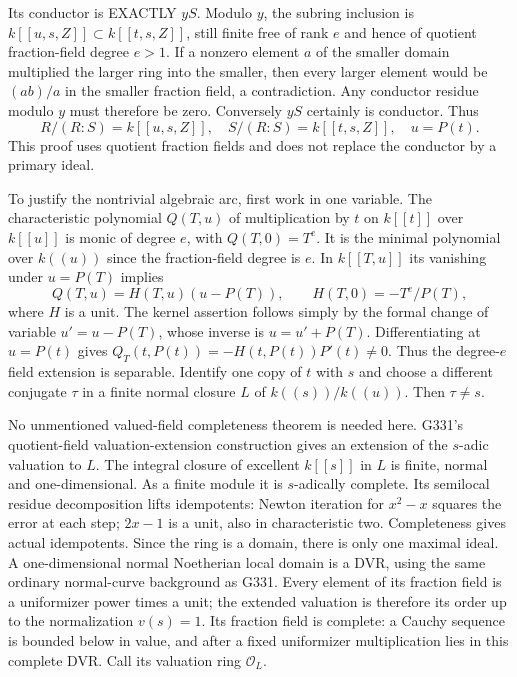 Its conductor is EXACTLY $yS$. Modulo $y$, the subring inclusion is
$k[[u,s,Z]]\subset k[[t,s,Z]]$, still finite free of rank $e$ and hence
of quotient fraction-field degree $e>1$. If a nonzero element $a$ of the
smaller domain multiplied the larger ring into the smaller, then every
larger element would be $(ab)/a$ in the smaller fraction field, a
contradiction. Any conductor residue modulo $y$ must therefore be zero.
Conversely $yS$ certainly is conductor. Thus
\[
 R/(R:S)=k[[u,s,Z]],\quad S/(R:S)=k[[t,s,Z]],\quad u=P(t).
\]
This proof uses quotient fraction fields and does not replace the
conductor by a primary ideal.

To justify the nontrivial algebraic arc, first work in one variable.
The characteristic polynomial $Q(T,u)$ of multiplication by $t$ on
$k[[t]]$ over $k[[u]]$ is monic of degree $e$, with $Q(T,0)=T^e$.
It is the minimal polynomial over $k((u))$ since the fraction-field
degree is $e$. In $k[[T,u]]$ its vanishing under $u=P(T)$ implies
\[
 Q(T,u)=H(T,u)(u-P(T)),\qquad H(T,0)=-T^e/P(T),
\]
where $H$ is a unit. The kernel assertion follows simply by the formal
change of variable $u'=u-P(T)$, whose inverse is $u=u'+P(T)$.
Differentiating at $u=P(t)$ gives
$Q_T(t,P(t))=-H(t,P(t))P'(t)\ne0$. Thus the degree-$e$ field extension
is separable. Identify one copy of $t$ with $s$ and choose a different
conjugate $\tau$ in a finite normal closure $L$ of $k((s))/k((u))$.
Then $\tau\ne s$.

No unmentioned valued-field completeness theorem is needed here.
G331's quotient-field valuation-extension construction gives an extension
of the $s$-adic valuation to $L$. The integral closure of excellent
$k[[s]]$ in $L$ is finite, normal and one-dimensional. As a finite module
it is $s$-adically complete. Its semilocal residue decomposition lifts
idempotents: Newton iteration for $x^2-x$ squares the error at each step;
$2x-1$ is a unit, also in characteristic two. Completeness gives actual
idempotents. Since the ring is a domain, there is only one maximal ideal.
A one-dimensional normal Noetherian local domain is a DVR, using the same
ordinary normal-curve background as G331. Every element of its fraction
field is a uniformizer power times a unit; the extended valuation is
therefore its order up to the normalization $v(s)=1$. Its fraction field
is complete: a Cauchy sequence is bounded below in value, and after a
fixed uniformizer multiplication lies in this complete DVR. Call its
valuation ring $\mathcal O_L$.

